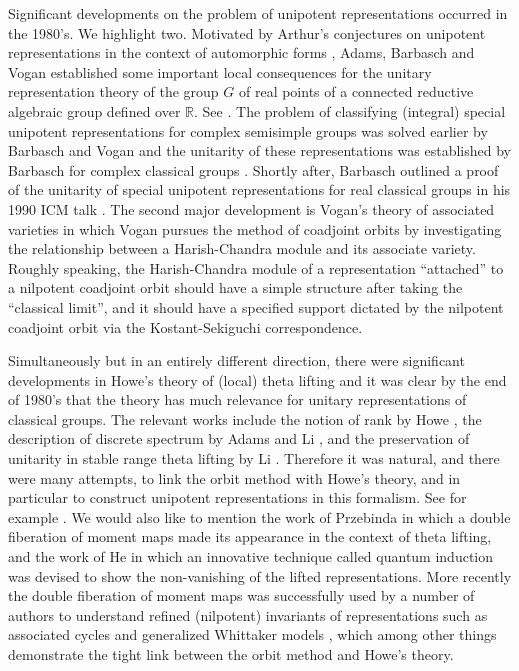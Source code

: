 \documentclass[12pt,a4paper]{amsart}
\newcommand{\R}{\mathbb R}
\numberwithin{equation}{section}
\theoremstyle{remark}
\begin{document}
Significant developments on the problem of unipotent representations occurred in
the 1980's. We highlight two. Motivated by Arthur's conjectures on unipotent
representations in the context of automorphic forms \cite{ArPro,ArUni}, Adams,
Barbasch and Vogan established some important local consequences for the unitary
representation theory of the group $G$ of real points of a connected reductive
algebraic group defined over $\R$. See \cite{ABV}. The problem of classifying
(integral) special unipotent representations for complex semisimple groups was
solved earlier by Barbasch and Vogan \cite{BVUni} and the unitarity of these representations
was established by Barbasch for complex classical groups \cite[Section 10]{B.Class}. Shortly after,
Barbasch outlined a proof of the unitarity of special unipotent
representations for real classical groups in his 1990 ICM talk \cite{B.Uni}. The
second major development is Vogan's theory of associated varieties \cite{Vo89}
in which Vogan pursues the method of coadjoint orbits by investigating the
relationship between a Harish-Chandra module and its associate variety. Roughly
speaking, the Harish-Chandra module of a representation ``attached'' to a nilpotent
coadjoint orbit should have a simple structure after taking the ``classical
limit'', and it should have a specified support dictated by the nilpotent
coadjoint orbit via the Kostant-Sekiguchi correspondence.

Simultaneously but in an entirely different direction, there were significant
developments in Howe's theory of (local) theta lifting and it was clear by the
end of 1980's that the theory has much relevance for unitary representations of
classical groups. The relevant works include the notion of rank by Howe
\cite{HoweRank}, the description of discrete spectrum by Adams \cite{Ad83} and Li \cite{Li90},
and the preservation of unitarity in stable range theta lifting by Li \cite{Li89}.
Therefore it was natural, and there were many attempts, to link the orbit method
with Howe's theory, and in particular to construct unipotent representations in
this formalism. See for example \cite{Sa,Pz,HZ,HL,Br,He,Tr,PT,B17}. We would also like
to mention the work of Przebinda \cite{Pz} in which a double
fiberation of moment maps made its appearance in the context of theta lifting,
and the work of He \cite{He} in which an innovative technique called quantum
induction was devised to show the non-vanishing of the lifted representations.
More recently the double fiberation of moment maps was successfully used by a
number of authors to understand refined (nilpotent) invariants of
representations such as associated cycles and generalized Whittaker models
\cite{NOTYK, NZ, GZ, LM}, which among other things demonstrate the tight link
between the orbit method and Howe's theory.
\end{document}
